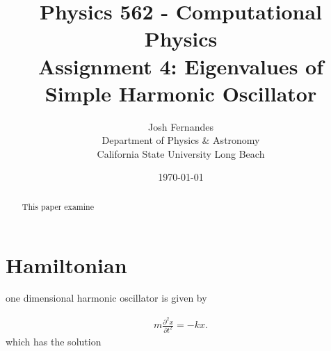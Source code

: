 \documentclass[12pt]{article}
\begin{document}




\title{Physics 562 - Computational Physics\\[.5cm]
Assignment 4: Eigenvalues of Simple Harmonic Oscillator}
\author{Josh Fernandes\\
Department of Physics \& Astronomy\\
California State University Long Beach}
\date{\today}

  
\maketitle



\begin{abstract}
This paper examine 
\end{abstract}

\section{Hamiltonian}
one dimensional harmonic oscillator is given by

\begin{gather}
m \frac{\partial^2 x}{\partial t^2} = -kx.
\end{gather}
which has the solution
\end{document}
